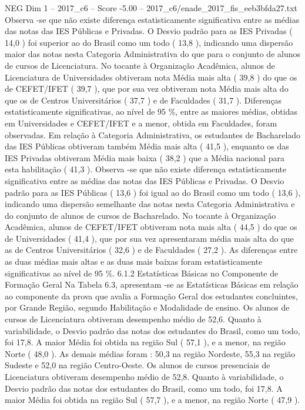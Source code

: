\begin{textsample}{NEG Dim 1 – 2017\_c6 – Score -5.00 – 2017\_c6/enade\_2017\_fis\_eeb3bfda27.txt}
Observa -se que não existe diferença estatisticamente significativa entre as médias das notas das IES Públicas e Privadas.
O Desvio padrão para as IES Privadas ( 14,0 ) foi superior ao do Brasil como um todo ( 13,8 ), indicando uma dispersão maior das notas nesta Categoria Administrativa do que para o conjunto de alunos de cursos de Licenciatura.
No tocante à Organização Acadêmica, alunos de Licenciatura de Universidades obtiveram nota Média mais alta ( 39,8 ) do que os de CEFET/IFET ( 39,7 ), que por sua vez obtiveram nota Média mais alta do que os de Centros Universitários ( 37,7 ) e de Faculdades ( 31,7 ).
Diferenças estatisticamente significativas, ao nível de 95 \%, entre as maiores médias, obtidas em Universidades e CEFET/IFET e a menor, obtida em Faculdades, foram observadas.
Em relação à Categoria Administrativa, os estudantes de Bacharelado das IES Públicas obtiveram também Média mais alta ( 41,5 ), enquanto os das IES Privadas obtiveram Média mais baixa ( 38,2 ) que a Média nacional para esta habilitação ( 41,3 ).
Observa -se que não existe diferença estatisticamente significativa entre as médias das notas das IES Públicas e Privadas.
O Desvio padrão para as IES Públicas ( 13,6 ) foi igual ao do Brasil como um todo ( 13,6 ), indicando uma dispersão semelhante das notas nesta Categoria Administrativa e do conjunto de alunos de cursos de Bacharelado.
No tocante à Organização Acadêmica, alunos de CEFET/IFET obtiveram nota mais alta ( 44,5 ) do que os de Universidades ( 41,4 ), que por sua vez apresentaram média mais alta do que as de Centros Universitários ( 32,6 ) e de Faculdades ( 27,2 ).
As diferenças entre as duas médias mais altas e as duas mais baixas foram estatisticamente significativas ao nível de 95 \%. 6.1.2 Estatísticas Básicas no Componente de Formação Geral Na Tabela 6.3, apresentam -se as Estatísticas Básicas em relação ao componente da prova que avalia a Formação Geral dos estudantes concluintes, por Grande Região, segundo Habilitação e Modalidade de ensino.
Os alunos de cursos de Licenciatura obtiveram desempenho médio de 52,6.
Quanto à variabilidade, o Desvio padrão das notas dos estudantes do Brasil, como um todo, foi 17,8.
A maior Média foi obtida na região Sul ( 57,1 ), e a menor, na região Norte ( 48,0 ).
As demais médias foram : 50,3 na região Nordeste, 55,3 na região Sudeste e 52,0 na região Centro-Oeste.
Os alunos de cursos presenciais de Licenciatura obtiveram desempenho médio de 52,8.
Quanto à variabilidade, o Desvio padrão das notas dos estudantes do Brasil, como um todo, foi 17,8.
A maior Média foi obtida na região Sul ( 57,7 ), e a menor, na região Norte ( 47,9 ).

\end{textsample}
